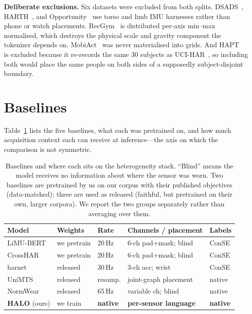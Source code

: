 \textbf{Deliberate exclusions.} Six datasets were excluded from both splits.
DSADS~\cite{dsads}, HARTH~\cite{harth}, and Opportunity~\cite{opportunity} use torso and limb IMU
harnesses rather than phone or watch placements. RecGym~\cite{recgym} is distributed per-axis
min--max normalised, which destroys the physical scale and gravity component the tokenizer
depends on. MobiAct~\cite{mobiact} was never materialised into grids. And HAPT~\cite{hapt} is
excluded because it re-records the same 30 subjects as UCI-HAR~\cite{ucihar}, so including both
would place the same people on both sides of a supposedly subject-disjoint boundary.

\section{Baselines}
\label{app:baselines}

Table~\ref{tab:baselines} lists the five baselines, what each was pretrained on, and how much
acquisition context each can receive at inference---the axis on which the comparison is not
symmetric.

\begin{table}[h]
  \centering
  \caption{Baselines and where each sits on the heterogeneity stack. ``Blind'' means the model
  receives no information about where the sensor was worn. Two baselines are pretrained by us on
  our corpus with their published objectives (data-matched); three are used as released
  (faithful, but pretrained on their own, larger corpora). We report the two groups separately
  rather than averaging over them.}
  \label{tab:baselines}
  \scriptsize
  \setlength{\tabcolsep}{2.5pt}
  \begin{tabular}{@{}l l l l l@{}}
    \toprule
    Model & Weights & Rate & Channels / placement & Labels \\
    \midrule
    LiMU-BERT~\cite{limubert}   & we pretrain & 20\,Hz & 6-ch pad$+$mask; blind & ConSE \\
    CrossHAR~\cite{crosshar}    & we pretrain & 20\,Hz & 6-ch pad$+$mask; blind & ConSE \\
    harnet~\cite{sslwearables}  & released    & 30\,Hz & 3-ch acc; wrist & ConSE \\
    UniMTS~\cite{unimts}        & released    & resamp. & joint-graph placement & native \\
    NormWear~\cite{normwear}    & released    & 65\,Hz & variable ch; blind & native \\
    \midrule
    \textbf{HALO} (ours)        & we train    & \textbf{native} & \textbf{per-sensor language} & \textbf{native} \\
    \bottomrule
  \end{tabular}
\end{table}

